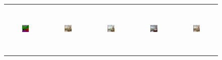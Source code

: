 \begin{figure}[]
\begin{tabular} {cc|cc|c}
\includegraphics[width=0.1932\textwidth,height=0.96in]{Images/Rec/ADE/label/ADE_val_00000146.png} & \includegraphics[width=0.1932\textwidth,height=0.96in]{Images/Rec/ADE/gt/ADE_val_00000146.jpg} &
\includegraphics[width=0.1932\textwidth,height=0.96in]{Images/Rec/ADE/pix2pixhd/ADE_val_00000146.jpg} &   \includegraphics[width=0.1932\textwidth,height=0.96in]{Images/Rec/ADE/spade/ADE_val_00000146.jpg} &  \includegraphics[width=0.1932\textwidth,height=0.96in]{Images/Rec/ADE/ours/ADE_val_00000146.png} \\


\end{tabular}
\end{figure}
